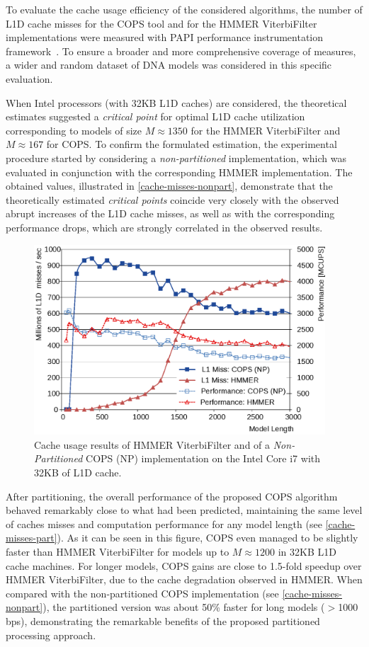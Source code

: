 \documentclass{bmcart}
\begin{document}
To evaluate the cache usage efficiency of the considered algorithms, the number of \ac{L1D} cache misses for the \ac{COPS} tool and for the HMMER ViterbiFilter implementations were measured with PAPI performance instrumentation framework~\cite{papi}. To ensure a broader and more comprehensive coverage of measures, a wider and random dataset of DNA models was considered in this specific evaluation.

When Intel processors (with 32KB \ac{L1D} caches) are considered, the theoretical estimates suggested a \emph{critical point} for optimal \ac{L1D} cache utilization corresponding to models of size $M{\approx}1350$ for the HMMER ViterbiFilter and $M{\approx}167$ for \ac{COPS}.
To confirm the formulated estimation, the experimental procedure started by considering a \textit{non-partitioned} implementation, which was evaluated in conjunction with the corresponding HMMER implementation. The obtained values, illustrated in \autoref{cache-misses-nonpart}, demonstrate that the theoretically estimated \emph{critical points} coincide very closely with the observed abrupt increases of the \ac{L1D} cache misses, as well as with the corresponding performance drops, which are strongly correlated in the observed results.

\begin{figure}[!b]
  \centering
  \includegraphics[width=0.97\textwidth]{img/cache_np.eps} 
  \caption{Cache usage results of HMMER ViterbiFilter and of a \textit{Non-Partitioned} COPS (NP) implementation on the Intel Core i7 with 32KB of L1D cache.}
  \label{cache-misses-nonpart}
\end{figure}

After partitioning, the overall performance of the proposed \ac{COPS} algorithm behaved remarkably close to what had been predicted, maintaining the same level of caches misses and computation performance for any model length (see \autoref{cache-misses-part}). As it can be seen in this figure, \ac{COPS} even managed to be slightly faster than HMMER ViterbiFilter for models up to $M{\approx}1200$ in 32KB L1D cache machines. For longer models, \ac{COPS} gains are close to 1.5-fold speedup over HMMER ViterbiFilter, due to the cache degradation observed in HMMER. When compared with the non-partitioned \ac{COPS} implementation (see \autoref{cache-misses-nonpart}), the partitioned version was about 50\% faster for long models ($>$1000 bps), demonstrating the remarkable benefits of the proposed partitioned processing approach.
\end{document}
